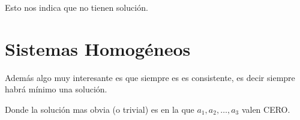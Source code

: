 \documentclass[12pt]{report}                                    %
\begin{document}
                Esto nos indica que no tienen solución.


























        \clearpage
        \section{Sistemas Homogéneos}

            Además algo muy interesante es que siempre es es consistente, es decir
            siempre habrá mínimo una solución.

            Donde la solución mas obvia (o trivial) es en la que $a_1, a_2, \dots, a_3$
            valen CERO.
\end{document}
